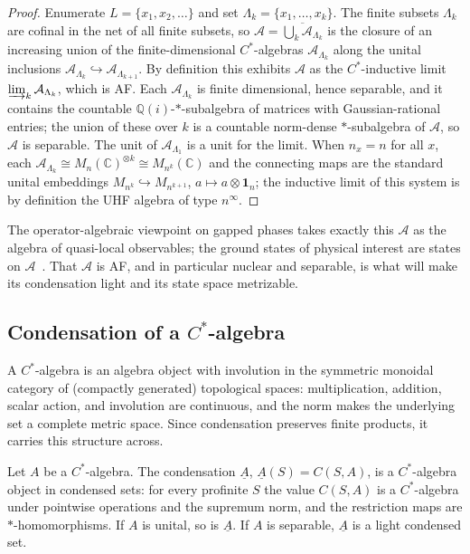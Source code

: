 \documentclass[12pt]{article}
\newcommand{\cond}[1]{\underline{#1}}          %
\newcommand{\qla}{\mathcal{A}}                  %
\newcommand{\CC}{\mathbb{C}}
\newcommand{\id}{\mathbf{1}}
\theoremstyle{plain}
\begin{document}
\begin{proof}
Enumerate $L=\{x_{1},x_{2},\dots\}$ and set $\Lambda_{k}=\{x_{1},\dots,x_{k}\}$. The
finite subsets $\Lambda_{k}$ are cofinal in the net of all finite subsets, so
$\qla=\overline{\bigcup_{k}\qla_{\Lambda_{k}}}$ is the closure of an increasing union
of the finite-dimensional $C^{*}$-algebras $\qla_{\Lambda_{k}}$ along the unital
inclusions $\qla_{\Lambda_{k}}\hookrightarrow\qla_{\Lambda_{k+1}}$. By definition
this exhibits $\qla$ as the $C^{*}$-inductive limit
$\varinjlim_{k}\qla_{\Lambda_{k}}$, which is AF. Each $\qla_{\Lambda_{k}}$ is finite
dimensional, hence separable, and it contains the countable
$\mathbb{Q}(i)$-$\ast$-subalgebra of matrices with Gaussian-rational entries; the
union of these over $k$ is a countable norm-dense $\ast$-subalgebra of $\qla$, so
$\qla$ is separable. The unit of $\qla_{\Lambda_{1}}$ is a unit for the limit. When
$n_{x}=n$ for all $x$, each $\qla_{\Lambda_{k}}\cong M_{n}(\CC)^{\otimes k}\cong
M_{n^{k}}(\CC)$ and the connecting maps are the standard unital embeddings
$M_{n^{k}}\hookrightarrow M_{n^{k+1}}$, $a\mapsto a\otimes\id_{n}$; the inductive
limit of this system is by definition the UHF algebra of type $n^{\infty}$.
\end{proof}

The operator-algebraic viewpoint on gapped phases takes exactly this $\qla$ as the
algebra of quasi-local observables; the ground states of physical interest are
states on $\qla$~\cite{ogata-classification-review,nsy-bulkgap}. That $\qla$ is AF,
and in particular nuclear and separable, is what will make its condensation light
and its state space metrizable.

\subsection{Condensation of a \texorpdfstring{$C^{*}$}{C*}-algebra}
\label{sec:condofalg}

A $C^{*}$-algebra is an algebra object with involution in the symmetric monoidal
category of (compactly generated) topological spaces: multiplication, addition,
scalar action, and involution are continuous, and the norm makes the underlying set
a complete metric space. Since condensation preserves finite products, it carries
this structure across.

\begin{proposition}
\label{prop:condcstar}
Let $A$ be a $C^{*}$-algebra. The condensation $\cond{A}$, $\cond{A}(S)=C(S,A)$, is a
$C^{*}$-algebra object in condensed sets: for every profinite $S$ the value $C(S,A)$
is a $C^{*}$-algebra under pointwise operations and the supremum norm, and the
restriction maps are $\ast$-homomorphisms. If $A$ is unital, so is $\cond{A}$. If $A$
is separable, $\cond{A}$ is a light condensed set.
\end{proposition}
\end{document}
